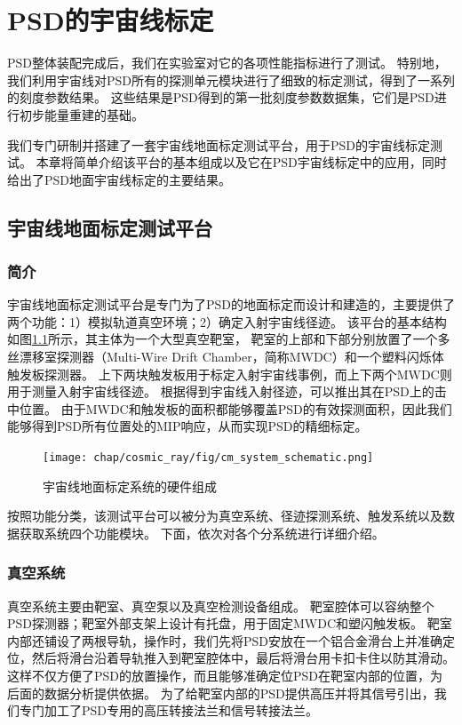 \chapter{PSD的宇宙线标定}
\label{ch:cosmic_ray}
PSD整体装配完成后，我们在实验室对它的各项性能指标进行了测试。
特别地，我们利用宇宙线对PSD所有的探测单元模块进行了细致的标定测试，得到了一系列的刻度参数结果。
这些结果是PSD得到的第一批刻度参数数据集，它们是PSD进行初步能量重建的基础。

我们专门研制并搭建了一套宇宙线地面标定测试平台，用于PSD的宇宙线标定测试。
本章将简单介绍该平台的基本组成以及它在PSD宇宙线标定中的应用，同时给出了PSD地面宇宙线标定的主要结果。

\section{宇宙线地面标定测试平台}
\label{sec:cosmic_ray:cm_system}
\subsection{简介}
\label{sec:cosmic_ray:introduction}
宇宙线地面标定测试平台是专门为了PSD的地面标定而设计和建造的，主要提供了两个功能：1）模拟轨道真空环境；2）确定入射宇宙线径迹。
该平台的基本结构如图\ref{fig:cosmic_ray:cm_system}所示，其主体为一个大型真空靶室，
靶室的上部和下部分别放置了一个多丝漂移室探测器（Multi-Wire Drift Chamber，简称MWDC）和一个塑料闪烁体触发板探测器。
上下两块触发板用于标定入射宇宙线事例，而上下两个MWDC则用于测量入射宇宙线径迹。
根据得到宇宙线入射径迹，可以推出其在PSD上的击中位置。
由于MWDC和触发板的面积都能够覆盖PSD的有效探测面积，因此我们能够得到PSD所有位置处的MIP响应，从而实现PSD的精细标定。
\begin{figure}[htbp]
	\centering
	\texttt{[image: chap/cosmic\_ray/fig/cm\_system\_schematic.png]}
	\caption{宇宙线地面标定系统的硬件组成}
	\label{fig:cosmic_ray:cm_system}
\end{figure}

按照功能分类，该测试平台可以被分为真空系统、径迹探测系统、触发系统以及数据获取系统四个功能模块。
下面，依次对各个分系统进行详细介绍。

\subsection{真空系统}
\label{sec:cosmic_ray:vacuum_system}
真空系统主要由靶室、真空泵以及真空检测设备组成。
靶室腔体可以容纳整个PSD探测器；靶室外部支架上设计有托盘，用于固定MWDC和塑闪触发板。
靶室内部还铺设了两根导轨，操作时，我们先将PSD安放在一个铝合金滑台上并准确定位，然后将滑台沿着导轨推入到靶室腔体中，最后将滑台用卡扣卡住以防其滑动。这样不仅方便了PSD的放置操作，而且能够准确定位PSD在靶室内部的位置，为后面的数据分析提供依据。
为了给靶室内部的PSD提供高压并将其信号引出，我们专门加工了PSD专用的高压转接法兰和信号转接法兰。

